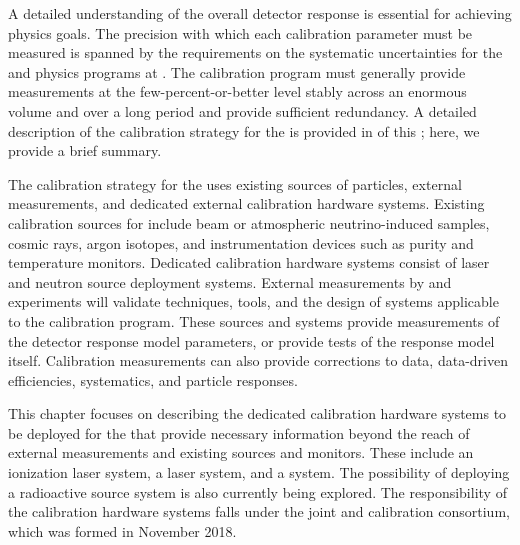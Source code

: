 


A detailed understanding of the overall detector response is essential for achieving  physics goals. The precision with which each calibration parameter must be measured is spanned by the requirements on the %
systematic uncertainties for the  %
and  physics programs at . The calibration program must generally provide measurements at the few-percent-or-better 
level stably across an enormous volume and over a long period and provide sufficient redundancy. A detailed description of the calibration strategy for the   is provided in \physchtools of this ; here, we provide a brief summary.

The %
calibration strategy for the   uses existing sources of particles, external measurements, and dedicated external calibration hardware systems. Existing calibration sources for  include beam or atmospheric neutrino-induced samples, cosmic rays, argon isotopes, and instrumentation devices such as  purity and temperature monitors. Dedicated calibration hardware systems consist of laser  and neutron source deployment systems.  External measurements by  and  experiments  will validate techniques, tools, and the design of systems applicable to the  calibration program. These sources and systems provide measurements of the detector response model parameters, or provide tests of the response model itself. Calibration measurements can also provide corrections to data, data-driven efficiencies, systematics, and particle responses.


This chapter focuses on describing the dedicated calibration hardware systems to be deployed for the   that provide necessary information beyond the reach of external measurements and existing sources and monitors. These include an ionization laser system, a \phel laser system, and a  system. The possibility of deploying a radioactive source system is also currently being explored. The responsibility of the calibration hardware systems falls under the joint  and  calibration consortium, which was formed in November 2018.



